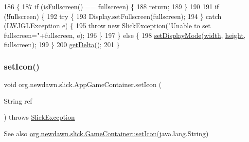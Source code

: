 \begin{DoxyCode}
186                                                                         \{
187         \textcolor{keywordflow}{if} (\mbox{\hyperlink{classorg_1_1newdawn_1_1slick_1_1_app_game_container_a9003be0b2466514951f265f9ec2cb5b9}{isFullscreen}}() == fullscreen) \{
188             \textcolor{keywordflow}{return};
189         \}
190         
191         \textcolor{keywordflow}{if} (!fullscreen) \{
192             \textcolor{keywordflow}{try} \{
193                 Display.setFullscreen(fullscreen);
194             \} \textcolor{keywordflow}{catch} (LWJGLException e) \{
195                 \textcolor{keywordflow}{throw} \textcolor{keyword}{new} SlickException(\textcolor{stringliteral}{"Unable to set fullscreen="}+fullscreen, e);
196             \}
197         \} \textcolor{keywordflow}{else} \{
198             \mbox{\hyperlink{classorg_1_1newdawn_1_1slick_1_1_app_game_container_aa2de68db61ddd3917a8edc0177ebdfe3}{setDisplayMode}}(\mbox{\hyperlink{classorg_1_1newdawn_1_1slick_1_1_game_container_a8c65160202b9f5aafde3fcf03e6155c9}{width}}, \mbox{\hyperlink{classorg_1_1newdawn_1_1slick_1_1_game_container_aac7312a21bbcaabec14be965c683d970}{height}}, fullscreen);
199         \}
200         \mbox{\hyperlink{classorg_1_1newdawn_1_1slick_1_1_game_container_a47af7100d91a7101cb71574dc70fb0dc}{getDelta}}();
201     \}
\end{DoxyCode}
\mbox{\label{classorg_1_1newdawn_1_1slick_1_1_app_game_container_a9e23ed4e8586f6ab9ef28487a595ce12}} 
\subsubsection{\texorpdfstring{set\+Icon()}{setIcon()}}
{\footnotesize\ttfamily void org.\+newdawn.\+slick.\+App\+Game\+Container.\+set\+Icon (\begin{DoxyParamCaption}\item[{String}]{ref }\end{DoxyParamCaption}) throws \mbox{\hyperlink{classorg_1_1newdawn_1_1slick_1_1_slick_exception}{Slick\+Exception}}\hspace{0.3cm}{\ttfamily [inline]}}

\begin{DoxySeeAlso}{See also}
\mbox{\hyperlink{classorg_1_1newdawn_1_1slick_1_1_game_container_a094c28e0d9f9827b10ddcd68267c65c3}{org.\+newdawn.\+slick.\+Game\+Container\+::set\+Icon}}(java.\+lang.\+String) 
\end{DoxySeeAlso}


